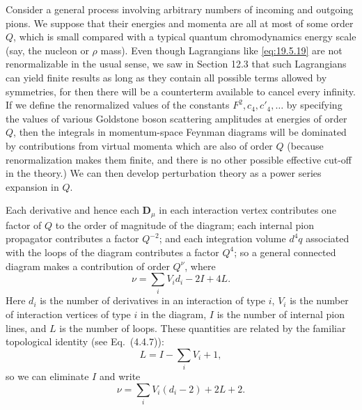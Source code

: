 Consider a general process involving arbitrary numbers of incoming and outgoing pions. We suppose that their energies and momenta are all at most of some order $Q$, which is small compared with a typical quantum chromodynamics energy scale (say, the nucleon or $\rho$ mass). Even though Lagrangians like \eqref{eq:19.5.19} are not renormalizable in the usual sense, we saw in Section 12.3 that such Lagrangians can yield finite results as long as they contain all possible terms allowed by symmetries, for then there will be a counterterm available to cancel every infinity. If we define the renormalized values of the constants $F^2,c_4,c'_4,\ldots$ by specifying the values of various Goldstone boson scattering amplitudes at energies of order $Q$, then the integrals in momentum-space Feynman diagrams will be dominated by contributions from virtual momenta which are also of order $Q$ (because renormalization makes them finite, and there is no other possible effective cut-off in the theory.) We can then develop perturbation theory as a power series expansion in $Q$.

Each derivative and hence each $\boldsymbol D_\mu$ in each interaction vertex contributes one factor of $Q$ to the order of magnitude of the diagram; each internal pion propagator contributes a factor $Q^{-2}$; and each integration volume $d^4q$ associated with the loops of the diagram contributes a factor $Q^4$; so a general connected diagram makes a contribution of order $Q^\nu$, where
\begin{equation}
\nu=\sum_iV_i d_i-2I+4L.
\tag{19.5.20}\label{eq:19.5.20}
\end{equation}
Here $d_i$ is the number of derivatives in an interaction of type $i$, $V_i$ is the number of interaction vertices of type $i$ in the diagram, $I$ is the number of internal pion lines, and $L$ is the number of loops. These quantities are related by the familiar topological identity (see Eq.~(4.4.7)):
\begin{equation}
L=I-\sum_iV_i+1,
\tag{19.5.21}\label{eq:19.5.21}
\end{equation}
so we can eliminate $I$ and write
\begin{equation}
\nu=\sum_iV_i(d_i-2)+2L+2.
\tag{19.5.22}\label{eq:19.5.22}
\end{equation}

